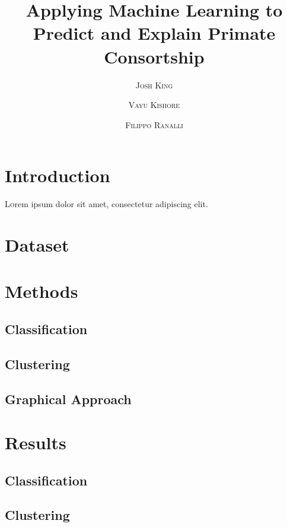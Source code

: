 \documentclass[twoside,twocolumn,paper=letter]{article}
\title{Applying Machine Learning to Predict and Explain Primate Consortship} %
\author{%
\textsc{Josh King} \\[1ex] 
\and 
\textsc{Vayu Kishore} \\[1ex] 
\and 
\textsc{Filippo Ranalli} \\[1ex] 
}
\date{} %
\begin{document}
\maketitle


\section{Introduction}

\lettrine[nindent=0em,lines=3]{L} orem ipsum dolor sit amet, consectetur adipiscing elit.
\blindtext %


\section{Dataset}
\section{Methods}
\subsection{Classification}
\subsection{Clustering}
\subsection{Graphical Approach}


\section{Results}
\subsection{Classification}
\subsection{Clustering}
\end{document}
